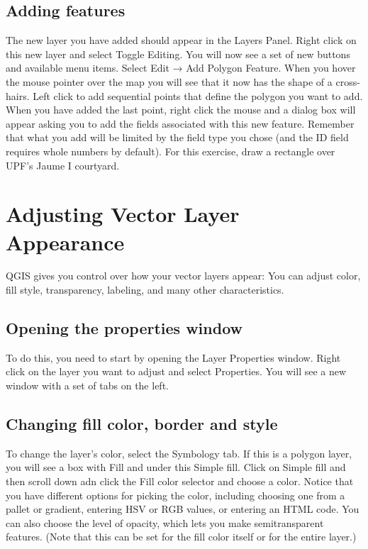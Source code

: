 \documentclass[]{book}
\begin{document}
\hypertarget{adding-features}{%
\section{Adding features}\label{adding-features}}

The new layer you have added should appear in the Layers Panel. Right click on this new layer and select Toggle Editing. You will now see a set of new buttons and available menu items. Select Edit → Add Polygon Feature. When you hover the mouse pointer over the map you will see that it now has the shape of a cross-hairs. Left click to add sequential points that define the polygon you want to add. When you have added the last point, right click the mouse and a dialog box will appear asking you to add the fields associated with this new feature. Remember that what you add will be limited by the field type you chose (and the ID field requires whole numbers by default). For this exercise, draw a rectangle over UPF's Jaume I courtyard.

\hypertarget{vector-appearance}{%
\chapter{Adjusting Vector Layer Appearance}\label{vector-appearance}}

QGIS gives you control over how your vector layers appear: You can adjust color, fill style, transparency, labeling, and many other characteristics.

\hypertarget{opening-the-properties-window}{%
\section{Opening the properties window}\label{opening-the-properties-window}}

To do this, you need to start by opening the Layer Properties window. Right click on the layer you want to adjust and select Properties. You will see a new window with a set of tabs on the left.

\hypertarget{changing-fill-color-border-and-style}{%
\section{Changing fill color, border and style}\label{changing-fill-color-border-and-style}}

To change the layer's color, select the Symbology tab. If this is a polygon layer, you will see a box with Fill and under this Simple fill. Click on Simple fill and then scroll down adn click the Fill color selector and choose a color. Notice that you have different options for picking the color, including choosing one from a pallet or gradient, entering HSV or RGB values, or entering an HTML code. You can also choose the level of opacity, which lets you make semitransparent features. (Note that this can be set for the fill color itself or for the entire layer.)
\end{document}
